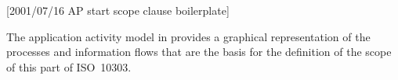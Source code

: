 [2001/07/16 AP start scope clause boilerplate]

\begin{anote}The application activity model in  provides a
       graphical representation of the processes and
       information flows that are the basis for the definition
       of the scope of this part of ISO~10303.\end{anote}

\endinput

